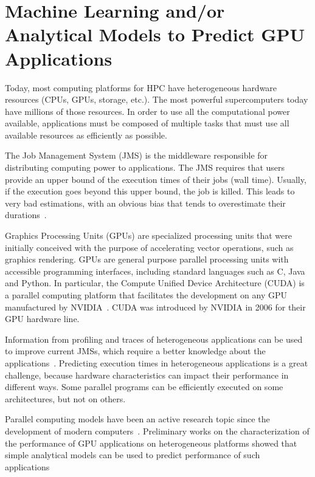 \chapter{Machine Learning and/or Analytical Models to Predict GPU Applications}

Today, most computing platforms for HPC have heterogeneous hardware resources (CPUs, GPUs, storage, etc.). The most powerful supercomputers today have millions of those resources. In order to use all the computational power available, applications must be composed of multiple tasks that must use all available resources as efficiently as possible.
 
The Job Management System (JMS) is the middleware responsible for distributing computing power to applications. The JMS requires that users provide an upper bound of the execution times of their jobs (wall time). Usually, if the execution goes beyond this upper bound, the job is killed. This leads to very bad estimations, with an obvious bias that tends to overestimate their durations~\cite{Gaj:Trystram:2002}.

Graphics Processing Units (GPUs) are specialized processing units that were initially conceived with the purpose of accelerating vector operations, such as graphics rendering. GPUs are general purpose parallel processing units with accessible programming interfaces, including standard languages such as C, Java and Python. In particular, the Compute Unified Device Architecture (CUDA) is a parallel computing platform that facilitates the development on any GPU manufactured by NVIDIA~\cite{CUDAGuide}. CUDA was introduced by NVIDIA in 2006 for their GPU hardware line.

Information from profiling and traces of heterogeneous applications can be used to improve current JMSs, which require a better knowledge about the applications~\cite{ Gaussier:2015}.
Predicting execution times in heterogeneous applications is a great challenge, because hardware characteristics can impact their performance in different ways. Some parallel programs can be efficiently executed on some architectures, but not on others. 

Parallel computing models have been an active research topic since the development of modern computers~\cite{Juurlink:1998}. Preliminary works on the characterization of the performance of GPU applications on heterogeneous platforms showed that simple analytical models can be used to predict performance of such applications~\cite{BSPGPUCache:2015,PredicModelGPU2009} 

